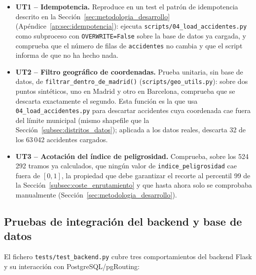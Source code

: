 \begin{itemize}
    \item \textbf{UT1 -- Idempotencia.} Reproduce en un test el patrón de idempotencia descrito en la Sección~\ref{sec:metodologia_desarrollo} (Apéndice~\ref{ap:sec:idempotencia}): ejecuta \texttt{scripts/04\_load\_accidentes.py} como subproceso con \texttt{OVERWRITE=False} sobre la base de datos ya cargada, y comprueba que el número de filas de \texttt{accidentes} no cambia y que el script informa de que no ha hecho nada.
    \item \textbf{UT2 -- Filtro geográfico de coordenadas.} Prueba unitaria, sin base de datos, de \texttt{filtrar\_dentro\_de\_madrid()} (\texttt{scripts/geo\_utils.py}): sobre dos puntos sintéticos, uno en Madrid y otro en Barcelona, comprueba que se descarta exactamente el segundo. Esta función es la que usa \texttt{04\_load\_accidentes.py} para descartar accidentes cuya coordenada cae fuera del límite municipal (mismo shapefile que la Sección~\ref{subsec:distritos_datos}); aplicada a los datos reales, descarta 32 de los 63\,042 accidentes cargados.
    \item \textbf{UT3 -- Acotación del índice de peligrosidad.} Comprueba, sobre los 524\,292 tramos ya calculados, que ningún valor de \texttt{indice\_peligrosidad} cae fuera de $[0, 1]$, la propiedad que debe garantizar el recorte al percentil 99 de la Sección~\ref{subsec:coste_enrutamiento} y que hasta ahora solo se comprobaba manualmente (Sección~\ref{sec:metodologia_desarrollo}).
\end{itemize}

\subsection{Pruebas de integración del backend y base de datos}
\label{subsec:pruebas_integracion}

El fichero \texttt{tests/test\_backend.py} cubre tres comportamientos del backend Flask y su interacción con PostgreSQL/pgRouting:

